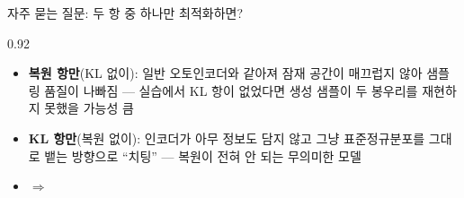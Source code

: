 \begin{frame}{자주 묻는 질문: 두 항 중 하나만 최적화하면?}
\begin{center}\begin{varwidth}{0.92\textwidth}
  \begin{itemize}
    \item \textbf{복원 항만}(KL 없이): 일반 오토인코더와 같아져
      잠재 공간이 매끄럽지 않아 샘플링 품질이 나빠짐 — 실습에서
      KL 항이 없었다면 생성 샘플이 두 봉우리를 재현하지 못했을
      가능성 큼
    \item \textbf{KL 항만}(복원 없이): 인코더가 아무 정보도 담지 않고
      그냥 표준정규분포를 그대로 뱉는 방향으로 ``치팅'' — 복원이
      전혀 안 되는 무의미한 모델
    \item $\Rightarrow$ 
  \end{itemize}
\end{varwidth}\end{center}
\end{frame}
